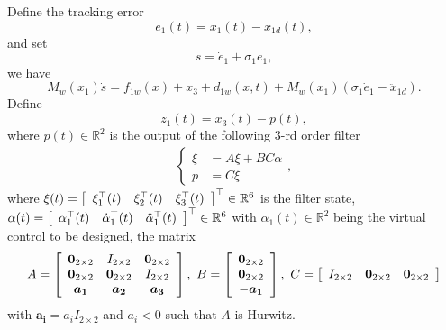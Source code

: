 \documentclass{article}
\begin{document}
	Define the tracking error
	\begin{equation}
	e_{1}(t) = x_{1}(t)-x_{1d}(t), \label{e1}
	\end{equation}
	and set 
	\begin{equation}
	s = \dot{e}_{1} + \sigma_{1}e_{1}, \label{s}
	\end{equation}
	we have 
	\begin{equation}
	M_{w}(x_{1})\dot{s} = f_{1w}(x) + x_{3} + d_{1w}(x,t) + M_{w}(x_{1})\left(\sigma_{1}\dot{e}_{1} - \ddot{x}_{1d}\right). \label{sdot1}
	\end{equation}
	Define 
	\begin{equation}
	z_{1}(t) = x_{3}(t)-p(t), \label{z1}
	\end{equation}
	where $p(t)\in\mathbb{R}^{2}$ is the output of the following 3-rd order filter
	\begin{align}
	\begin{cases}
	\dot{\xi} &= A\xi + BC\alpha \\
	p &= C\xi 
	\end{cases}, \label{filter}
	\end{align}
	where $\xi(t) = \left[
	\begin{array}[c]{ccc}
	\xi_{1}^{\top}(t) & \xi_{2}^{\top}(t) & \xi_{3}^{\top}(t)
	\end{array}
	\right]^{\top} \in\mathbb{R}^{6}$ is the filter state, $\alpha(t) = \left[
	\begin{array}[c]{ccc}
	\alpha_{1}^{\top}(t) & \dot{\alpha}_{1}^{\top}(t) & \ddot{\alpha}_{1}^{\top}(t)
	\end{array}
	\right]^{\top} \in\mathbb{R}^{6}$ with $\alpha_{1}(t)\in\mathbb{R}^{2}$ being the virtual control to be designed, the matrix
	\begin{equation}
	A = \left[
	\begin{array}[c]{ccc}
	\textbf{0}_{2\times 2} & I_{2\times 2} & \textbf{0}_{2\times 2} \\
	\textbf{0}_{2\times 2} & \textbf{0}_{2\times 2} & I_{2\times 2} \\
	\boldsymbol{a_{1}} & \boldsymbol{a_{2}} & \boldsymbol{a_{3}}
	\end{array}
	\right], 
	\text{   } B = \left[
	\begin{array}[c]{c}
	\textbf{0}_{2\times 2} \\
	\textbf{0}_{2\times 2} \\
	-\boldsymbol{a_{1}}
	\end{array}
	\right], \text{   } C = \left[
	\begin{array}[c]{ccc}
	I_{2\times 2} & \textbf{0}_{2\times 2} & \textbf{0}_{2\times 2}\\
	\end{array}
	\right]
	\end{equation}
	with $\boldsymbol{a_{i}}=a_{i}I_{2\times 2}$ and $a_{i}<0$ such that $A$ is Hurwitz.
	
\end{document}
